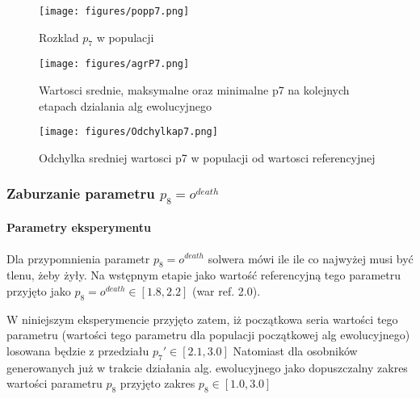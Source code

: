 \documentclass[]{article}
\let\oldparagraph\paragraph
\renewcommand{\paragraph}[1]{\oldparagraph{#1}\mbox{}}
\begin{document}
\begin{figure}[htbp]
\centering
\texttt{[image: figures/popp7.png]}
\caption{Rozklad \(p_7\) w populacji}
\end{figure}

\begin{figure}[htbp]
\centering
\texttt{[image: figures/agrP7.png]}
\caption{Wartosci srednie, maksymalne oraz minimalne p7 na kolejnych
etapach dzialania alg ewolucyjnego}
\end{figure}

\begin{figure}[htbp]
\centering
\texttt{[image: figures/Odchylkap7.png]}
\caption{Odchylka sredniej wartosci p7 w populacji od wartosci
referencyjnej}
\end{figure}

\pagebreak

\subsubsection{\texorpdfstring{Zaburzanie parametru
\(p_8=o^{death}\)}{Zaburzanie parametru p\_8=o\^{}\{death\}}}\label{zaburzanie-parametru-pux5f8odeath}

\paragraph{Parametry eksperymentu}\label{parametry-eksperymentu-1}

Dla przypomnienia parametr \(p_8=o^{death}\) solwera mówi ile ile co
najwyżej musi być tlenu, żeby żyły. Na wstępnym etapie jako wartość
referencyjną tego parametru przyjęto jako
\(p_8=o^{death} \in [1.8,2.2]\) (war ref. 2.0).

W niniejszym eksperymencie przyjęto zatem, iż początkowa seria wartości
tego parametru (wartości tego parametru dla populacji początkowej alg
ewolucyjnego) losowana będzie z przedziału \(p_7' \in [2.1,3.0]\)
Natomiast dla osobników generowanych już w trakcie działania alg.
ewolucyjnego jako dopuszczalny zakres wartości parametru \(p_8\)
przyjęto zakres \(p_8 \in [1.0,3.0]\)
\end{document}
